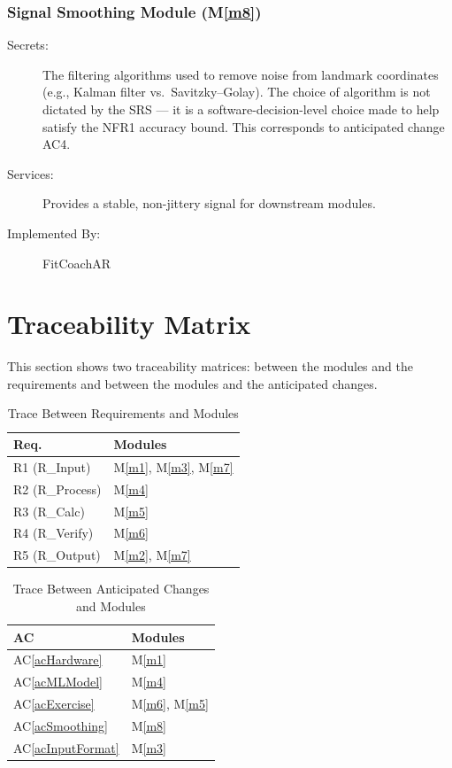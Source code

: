 \documentclass[12pt, titlepage]{article}
\newcommand{\acref}[1]{AC\ref{#1}}
\newcommand{\mref}[1]{M\ref{#1}}
\begin{document}
\subsubsection{Signal Smoothing Module (\mref{m8})}
\begin{description}
\item[Secrets:] The filtering algorithms used to remove noise from landmark
  coordinates (e.g., Kalman filter vs.\ Savitzky--Golay). The choice of
  algorithm is not dictated by the SRS --- it is a software-decision-level
  choice made to help satisfy the NFR1 accuracy bound. This corresponds to
  anticipated change AC4.
\item[Services:] Provides a stable, non-jittery signal for downstream modules.
\item[Implemented By:] FitCoachAR
\end{description}

\section{Traceability Matrix} \label{SecTM}

This section shows two traceability matrices: between the modules and the
requirements and between the modules and the anticipated changes.

\begin{table}[H]
\centering
\begin{tabular}{p{} p{}}
\toprule
\textbf{Req.} & \textbf{Modules}\\
\midrule
R1 (R\_Input) & \mref{m1}, \mref{m3}, \mref{m7}\\
R2 (R\_Process) & \mref{m4}\\
R3 (R\_Calc) & \mref{m5}\\
R4 (R\_Verify) & \mref{m6}\\
R5 (R\_Output) & \mref{m2}, \mref{m7}\\
\bottomrule
\end{tabular}
\caption{Trace Between Requirements and Modules}
\label{TblRT}
\end{table}

\begin{table}[H]
\centering
\begin{tabular}{p{} p{}}
\toprule
\textbf{AC} & \textbf{Modules}\\
\midrule
\acref{acHardware} & \mref{m1}\\
\acref{acMLModel} & \mref{m4}\\
\acref{acExercise} & \mref{m6}, \mref{m5}\\
\acref{acSmoothing} & \mref{m8}\\
\acref{acInputFormat} & \mref{m3}\\
\bottomrule
\end{tabular}
\caption{Trace Between Anticipated Changes and Modules}
\label{TblACT}
\end{table}
\end{document}

